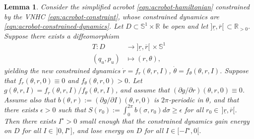 \documentclass[journal,twoside,web, twocolumn,draftcls]{ieeecolor}
\newtheorem{lemma}{Lemma} %
\newcommand*{\R}{\mathbb{R}}
\newcommand*{\Sone}{\mathbb{S}^1}
\newcommand*{\SxR}{\Sone \times \R}
\begin{document}
\begin{lemma}\label{lemma:energy-regulation-D}
    Consider the simplified acrobot \eqref{eqn:acrobot-hamiltonian} constrained
    by the VNHC \eqref{eqn:acrobot-constraint}, whose constrained dynamics are
    \eqref{eqn:acrobot-constrained-dynamics}.
    Let \(D \subset \SxR\) be open and 
    let \(]\underline{r}, \overline{r}[ \, \subset \R_{> 0}\).
    Suppose there exists a diffeomorphism 
    \begin{align*}
        T : D &\to ]\underline{r},\overline{r}[ \, \times \Sone
         \\
        (q_u,p_u) &\mapsto (r,\theta)
        ,
    \end{align*}
    yielding the new constrained dynamics \(\dot{r} = f_r(\theta,r,I)\),
    \(\dot{\theta} = f_\theta(\theta,r,I)\).
    Suppose that \(f_r(\theta,r,0) \equiv 0\) and \(f_\theta(\theta,r,0) > 0\).
    Let \(g(\theta,r,I) = f_r(\theta,r,I)/f_\theta(\theta,r,I)\), and assume that 
    \((\partial g/\partial r)(\theta,r,0) \equiv 0\).
    Assume also that \(b(\theta,r) := (\partial g/\partial I)(\theta,r,0)\)
    is \(2\pi\)-periodic in \(\theta\),
    and that there exists \(\epsilon > 0\) such that 
    \(S(r_0) := \int_0^{2\pi} b(\sigma,r_0)d\sigma \geq \epsilon\)
    for all \(r_0 \in \, ]\underline{r},\overline{r}[\).
    Then there exists \(I^\star > 0\) small enough that the constrained dynamics
    gain energy on \(D\) for all \(I \in \,]0, I^\star]\), and lose energy on \(D\)
    for all \(I \in [-I^\star, 0[\).
\end{lemma}
\end{document}
